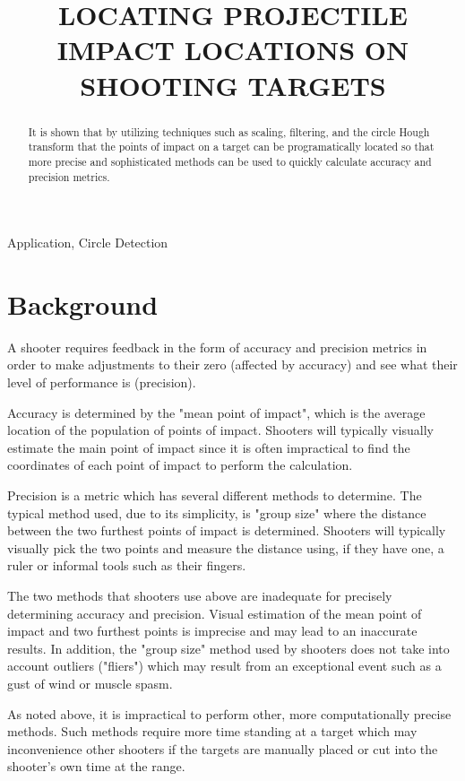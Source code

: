 \documentclass{article}
\title{LOCATING PROJECTILE IMPACT LOCATIONS ON SHOOTING TARGETS}
\begin{document}
%
\maketitle
%
\begin{abstract}
It is shown that by utilizing techniques such as scaling, filtering, and the
circle Hough transform that the points of impact on a target can be programatically located so that
more precise and sophisticated methods can be used to quickly calculate accuracy and precision metrics.
\end{abstract}
%
\begin{keywords}
Application, Circle Detection
\end{keywords}
%
\section{Background}
\label{sec:background}
A shooter requires feedback in the form of accuracy and precision metrics in order
to make adjustments to their zero (affected by accuracy) and see what their level
of performance is (precision).

Accuracy is determined by the "mean point of impact", which is the average location
of the population of points of impact. Shooters will typically visually estimate
the main point of impact since it is often impractical to find the coordinates
of each point of impact to perform the calculation.

Precision is a metric which has several different methods to determine.
The typical method used, due to its simplicity,  is "group size" where the distance
between the two furthest points of impact is determined. Shooters will typically visually
pick the two points and measure the distance using, if they have one, a ruler or
informal tools such as their fingers.

The two methods that shooters use above are inadequate for precisely determining
accuracy and precision. Visual estimation of the mean point of impact and two 
furthest points is imprecise and may lead to an inaccurate results. In addition,
the "group size" method used by shooters does not take into account outliers ("fliers")
which may result from an exceptional event such as a gust of wind or muscle spasm.

As noted above, it is impractical to perform other, more computationally precise methods.
Such methods require more time standing at a target which may inconvenience other shooters
if the targets are manually placed or cut into the shooter's own time at the range.
\end{document}
